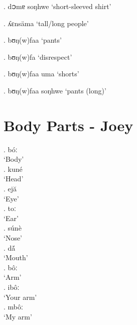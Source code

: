 \documentclass{assets/fieldnotes}
\begin{document}
\ex. d၁mɐ soŋhwe
`short-sleeved shirt'

\ex. ʎɛnsäma
`tall/long people'

\ex. bʊŋ(w)faa
`pants'

\ex. bʊŋ(w)fa
`disrespect'

\ex. bʊŋ(w)faa uma
`shorts'

\ex. bʊŋ(w)faa soŋhwe
`pants (long)'


\section{Body Parts - Joey} 




\exg. bóː\\
`Body' \\

\exg. kuné\\
`Head'\\

\exg. ejă\\
`Eye'
\\

\exg. toː\\
`Ear' \\

\exg. súnè\\
`Nose' \\

\exg. dá̆\\
`Mouth' \\

\exg. bôː\\
`Arm' \\

\exg. ibôː\\
`Your arm' \\

\exg. mbôː\\
`My arm' \\

\end{document}
